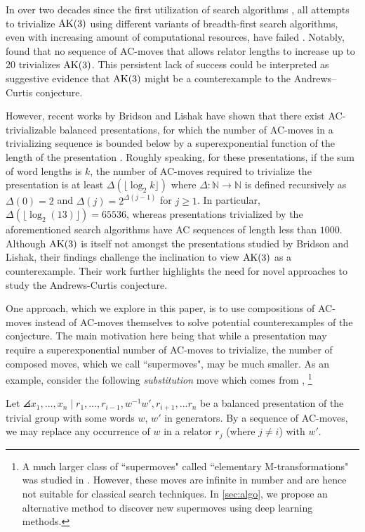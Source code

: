 In over two decades since the first utilization of search algorithms \cite{genetic, bfs-ac}, all attempts to trivialize $\text{AK}(3)$ using different variants of breadth-first search algorithms, even with increasing amount of computational resources, have failed \cite{Bowman-McCaul, krawiec2016distance, Panteleev-Ushakov}.
Notably, \cite{Panteleev-Ushakov} found that no sequence of AC-moves that allows relator lengths to increase up to 20 trivializes $\text{AK}(3)$.
This persistent lack of success could be interpreted as suggestive evidence that $\text{AK}(3)$ might be a counterexample to the Andrews--Curtis conjecture.

However, recent works by Bridson and Lishak have shown that there exist AC-trivializable balanced presentations, for which the number of AC-moves in a trivializing sequence is bounded below by a superexponential function of the length of the presentation \cite{Bridson, Lishak}.
Roughly speaking, for these presentations, if the sum of word lengths is $k$, the number of AC-moves required to trivialize the presentation is at least $\Delta (\lfloor \log_2 k \rfloor)$ where $\Delta \colon \mathbb{N} \to \mathbb{N}$ is defined recursively as $\Delta(0) = 2$ and $\Delta (j) = 2^{\Delta(j-1)}$ for $j \geq 1$.
In particular, $\Delta (\lfloor \log_2 (13) \rfloor) = 65536$, whereas presentations trivialized by the aforementioned search algorithms have AC sequences of length less than $1000$.
Although $\text{AK}(3)$ is itself not amongst the presentations studied by Bridson and Lishak, their findings challenge the inclination to view $\text{AK}(3)$ as a counterexample. Their work further highlights the need for novel approaches to study the Andrews-Curtis conjecture.

One approach, which we explore in this paper, is to use compositions of AC-moves instead of AC-moves themselves to solve potential counterexamples of the conjecture. The main motivation here being that while a presentation may require a superexponential number of AC-moves to trivialize, the number of composed moves, which we call ``supermoves", may be much smaller. As an example, consider the following \emph{substitution} move which comes from \cite{BurnsI},
\footnote{A much larger class of ``supermoves" called ``elementary M-transformations" was studied in \cite{BurnsI}. However, these moves are infinite in number and are hence not suitable for classical search techniques. In \cref{sec:algo}, we propose an alternative method to discover new supermoves using deep learning methods.}

\begin{definition}[Substitution]\label{def:ac-sub}
 Let $\angles{x_1, \dots, x_n \mid r_1, \dots, r_{i-1}, w^{-1}w', r_{i+1}, \dots  r_n}$ be a balanced presentation of the trivial group with some words $w$, $w'$ in generators. By a sequence of AC-moves, we may replace any occurrence of $w$ in a relator $r_j$ (where $j \neq i$) with $w'$.
\end{definition}

